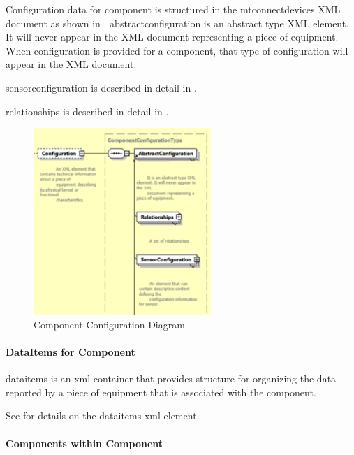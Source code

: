 

Configuration data for \gls{component} is structured in the \gls{mtconnectdevices} XML document as shown in .   \gls{abstractconfiguration} is an abstract type XML element.   It will never appear in the XML document representing a piece of equipment.    When \gls{configuration} is provided for a component, that type of \gls{configuration} will appear in the XML document.

\gls{sensorconfiguration} is described in detail in .

\gls{relationships} is described in detail in .

\begin{figure}[ht]
  \centering
  \includegraphics[width=0.6\textwidth]{figures/component-configuration-schema-diagram.png}
  \caption{Component Configuration Diagram}
  \label{fig:component-configuration-diagram}
\end{figure}
\FloatBarrier

\paragraph{DataItems for Component}\mbox{}

\gls{dataitems} is an \gls{xml} container that provides structure for organizing the data reported by a piece of equipment that is associated with the \gls{component}.   

See  for details on the \gls{dataitems} \gls{xml} element.

\newpage

\paragraph{Components within Component}\mbox{}

